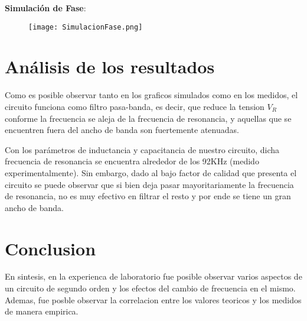 \documentclass[a4paper,12pt]{article}
\begin{document}
\textbf{Simulación de Fase}:
\begin{figure}[H]
    \centering
    \texttt{[image: SimulacionFase.png]}
\end{figure}

\section{Análisis de los resultados}
\hspace{1cm}Como es posible observar tanto en los graficos simulados como en los medidos, el circuito funciona como filtro pasa-banda, es decir, 
que reduce la tension $V_R$ conforme la frecuencia se aleja de la frecuencia de resonancia, y aquellas que se encuentren fuera 
del ancho de banda son fuertemente atenuadas. 

\hspace{1cm}Con los parámetros de inductancia y capacitancia de nuestro circuito, dicha frecuencia de 
resonancia se encuentra alrededor de los 92KHz (medido experimentalmente). Sin embargo, dado al bajo factor de calidad que presenta el circuito se puede observar que si bien deja pasar mayoritariamente la frecuencia de resonancia, no es muy efectivo en filtrar el resto y por ende se tiene un gran ancho de banda.

\section{Conclusion}
\hspace{1cm}En sintesis, en la experienca de laboratorio fue posible observar varios aspectos de un circuito  de segundo orden y los efectos del cambio de frecuencia en el mismo. Ademas, fue posble observar la correlacion entre los valores teoricos y los medidos de manera empirica.
\end{document}

